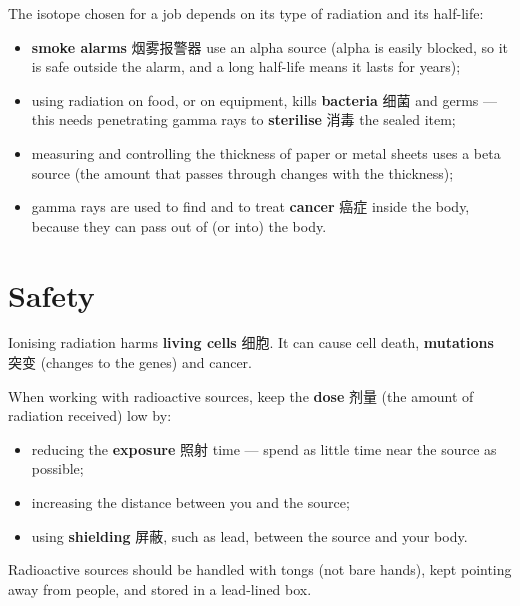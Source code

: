 \documentclass[11pt]{article}
\begin{document}
The isotope chosen for a job depends on its type of radiation and its half-life:

\begin{itemize}
\item \textbf{smoke alarms} 烟雾报警器 use an alpha source (alpha is easily blocked, so it is safe outside the alarm, and a long half-life means it lasts for years);

\item using radiation on food, or on equipment, kills \textbf{bacteria} 细菌 and germs — this needs penetrating gamma rays to \textbf{sterilise} 消毒 the sealed item;

\item measuring and controlling the thickness of paper or metal sheets uses a beta source (the amount that passes through changes with the thickness);

\item gamma rays are used to find and to treat \textbf{cancer} 癌症 inside the body, because they can pass out of (or into) the body.

\end{itemize}

\section*{Safety}

Ionising radiation harms \textbf{living cells} 细胞. It can cause cell death, \textbf{mutations} 突变 (changes to the genes) and cancer.

When working with radioactive sources, keep the \textbf{dose} 剂量 (the amount of radiation received) low by:

\begin{itemize}
\item reducing the \textbf{exposure} 照射 time — spend as little time near the source as possible;

\item increasing the distance between you and the source;

\item using \textbf{shielding} 屏蔽, such as lead, between the source and your body.

\end{itemize}

Radioactive sources should be handled with tongs (not bare hands), kept pointing away from people, and stored in a lead-lined box.
\end{document}
